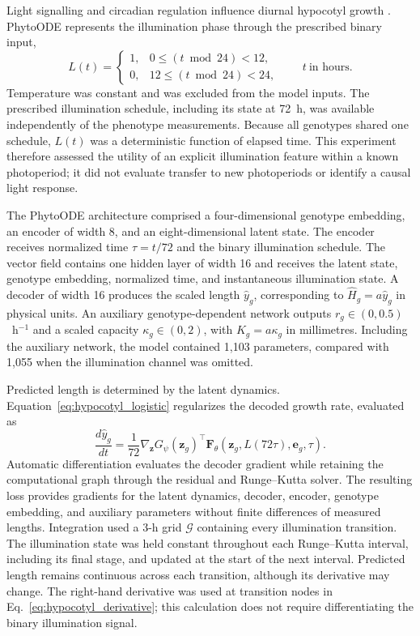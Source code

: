 Light signalling and circadian regulation influence diurnal hypocotyl growth \citep{nozue2007rhythmic}. PhytoODE represents the illumination phase through the prescribed binary input,
\begin{equation}
 L(t)=
 \begin{cases}
  1,&0\leq (t\bmod 24)<12,\\
  0,&12\leq (t\bmod 24)<24,
 \end{cases}
 \qquad t\ \text{in hours}.
 \label{eq:hypocotyl_light}
\end{equation}
Temperature was constant and was excluded from the model inputs. The prescribed illumination schedule, including its state at 72~h, was available independently of the phenotype measurements. Because all genotypes shared one schedule, $L(t)$ was a deterministic function of elapsed time. This experiment therefore assessed the utility of an explicit illumination feature within a known photoperiod; it did not evaluate transfer to new photoperiods or identify a causal light response.

The PhytoODE architecture comprised a four-dimensional genotype embedding, an encoder of width 8, and an eight-dimensional latent state. The encoder receives normalized time $\tau=t/72$ and the binary illumination schedule. The vector field contains one hidden layer of width 16 and receives the latent state, genotype embedding, normalized time, and instantaneous illumination state. A decoder of width 16 produces the scaled length $\hat y_g$, corresponding to $\hat H_g=a\hat y_g$ in physical units. An auxiliary genotype-dependent network outputs $r_g\in(0,0.5)$~h$^{-1}$ and a scaled capacity $\kappa_g\in(0,2)$, with $K_g=a\kappa_g$ in millimetres. Including the auxiliary network, the model contained 1,103 parameters, compared with 1,055 when the illumination channel was omitted.

Predicted length is determined by the latent dynamics. Equation~\eqref{eq:hypocotyl_logistic} regularizes the decoded growth rate, evaluated as
\begin{equation}
 \frac{d\hat y_g}{dt}
 =\frac{1}{72}\nabla_{\mathbf z}G_\psi(\mathbf z_g)^{\top}
 \mathbf F_\theta(\mathbf z_g,L(72\tau),\mathbf e_g,\tau).
 \label{eq:hypocotyl_derivative}
\end{equation}
Automatic differentiation evaluates the decoder gradient while retaining the computational graph through the residual and Runge--Kutta solver. The resulting loss provides gradients for the latent dynamics, decoder, encoder, genotype embedding, and auxiliary parameters without finite differences of measured lengths. Integration used a 3-h grid $\mathcal G$ containing every illumination transition. The illumination state was held constant throughout each Runge--Kutta interval, including its final stage, and updated at the start of the next interval. Predicted length remains continuous across each transition, although its derivative may change. The right-hand derivative was used at transition nodes in Eq.~\eqref{eq:hypocotyl_derivative}; this calculation does not require differentiating the binary illumination signal.

